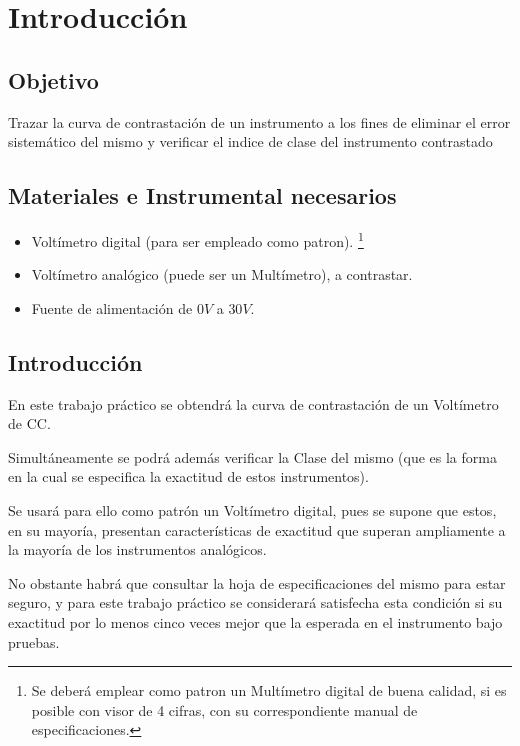 \chapter{Introducción}

\section{Objetivo}
Trazar la curva de contrastación de un instrumento a los fines de eliminar el error sistemático del mismo y verificar el indice de clase del instrumento contrastado

\section{Materiales e Instrumental necesarios}
\begin{itemize}
  \item Voltímetro digital (para ser empleado como patron).
    \footnote{Se deberá emplear como patron un Multímetro digital de buena calidad, si es posible con visor de 4  cifras, con su correspondiente manual de especificaciones.}
  \item Voltímetro analógico (puede ser un Multímetro), a contrastar.
  \item Fuente de alimentación de $0V$ a $30V$.
\end{itemize}

\section{Introducción}
En este trabajo práctico se obtendrá la curva de contrastación de un Voltímetro de CC.

Simultáneamente se podrá además verificar la Clase del mismo (que es la forma en la cual se especifica la exactitud de estos instrumentos).

Se usará para ello como patrón un Voltímetro digital, pues se supone que estos, en su mayoría, presentan características de exactitud que superan ampliamente a la mayoría de los instrumentos analógicos.

No obstante habrá que consultar la hoja de especificaciones del mismo para estar seguro, y para este trabajo práctico se considerará satisfecha esta condición si su exactitud por lo menos cinco veces mejor que la esperada en el instrumento bajo pruebas.
